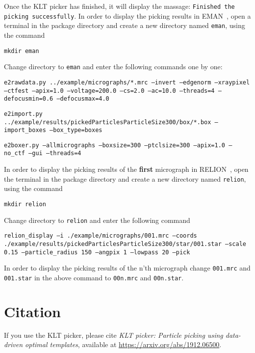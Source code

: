 \documentclass[12pt,a4paper]{article}
\begin{document}
Once the KLT picker has finished, it will display the massage: \texttt{Finished the picking successfully}. In order to display the picking results in EMAN~\cite{eman}, open a terminal in the package directory and create a new directory named \texttt{eman}, using the command
\begin{flushleft}
\texttt{mkdir eman}
\end{flushleft}
Change directory  to \texttt{eman} and enter the following commands one by one:
\begin{flushleft}
	\texttt{e2rawdata.py ../example/micrographs/*.mrc --invert --edgenorm --xraypixel --ctfest --apix=1.0 --voltage=200.0 --cs=2.0 --ac=10.0 --threads=4 --defocusmin=0.6 --defocusmax=4.0}
\end{flushleft}
\begin{flushleft}
	\texttt{e2import.py ../example/results/pickedParticlesParticleSize300/box/*.box --import\_boxes --box\_type=boxes}
\end{flushleft}
\begin{flushleft}
	\texttt{e2boxer.py --allmicrographs --boxsize=300 --ptclsize=300 --apix=1.0 --no\_ctf --gui --threads=4}
\end{flushleft}
 In order to display the picking results of the \textbf{first} micrograph in RELION~\cite{relion}, open the terminal in the package directory and create a new directory named \texttt{relion}, using the command
\begin{flushleft}
\texttt{mkdir relion}
\end{flushleft}
Change directory  to \texttt{relion} and enter the following command
 \begin{flushleft}
 	\texttt{relion\_display --i ./example/micrographs/001.mrc --coords ./example/results/pickedParticlesParticleSize300/star/001.star --scale 0.15 --particle\_radius 150 --angpix 1 --lowpass 20 --pick}
 \end{flushleft}
 In order to display the picking results of the n'th micrograph change   \texttt{001.mrc}  and \texttt{001.star} in the above command to \texttt{00n.mrc} and  \texttt{00n.star}.


\section{Citation}
If you use the KLT picker, please cite \emph{KLT picker: Particle picking using data-driven optimal templates}, available at \url{https://arxiv.org/abs/1912.06500}.
\end{document}
